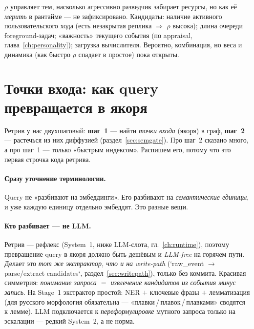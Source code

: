 \begin{openq}
$\rho$ управляет тем, насколько агрессивно разведчик забирает ресурсы, но как её
\emph{мерить} в рантайме — не зафиксировано. Кандидаты: наличие активного
пользовательского хода (есть незакрытая реплика $\Rightarrow$ $\rho$ высока); длина
очереди foreground-задач; «важность» текущего события (по appraisal,
глава~\ref{ch:personality}); загрузка вычислителя. Вероятно, комбинация, но веса и
динамика (как быстро $\rho$ спадает в простое) пока открыты.
\end{openq}

\section{Точки входа: как query превращается в якоря}
\label{sec:entrypoints}

Ретрив у нас двухшаговый: \textbf{шаг~1} — найти \emph{точки входа} (якоря) в граф,
\textbf{шаг~2} — растечься из них диффузией (раздел~\ref{sec:semgate}). Про шаг~2 сказано
много, а про шаг~1 — только «быстрым индексом». Распишем его, потому что это первая строчка
кода ретрива.

\paragraph{Сразу уточнение терминологии.} Query не «разбивают на эмбеддинги». Его разбивают
на \emph{семантические единицы}, и уже каждую единицу отдельно эмбеддят. Это разные вещи.

\paragraph{Кто разбивает — не LLM.} Ретрив — рефлекс (System~1, ниже LLM-слота,
гл.~\ref{ch:runtime}), поэтому превращение query в якоря должно быть дешёвым и
\emph{LLM-free} на горячем пути. Делает это \emph{тот же экстрактор, что и на write-path}
(`raw\_event $\to$ parse/extract candidates`, раздел~\ref{sec:writepath}), только без
коммита. Красивая симметрия: \emph{понимание запроса $=$ извлечение кандидатов из события
минус запись}. На Stage~1 экстрактор простой: NER $+$ ключевые фразы $+$ лемматизация
(для русского морфология обязательна — «плавки\,/\,плавок\,/\,плавками» сводятся к лемме).
LLM подключается к \emph{переформулировке} мутного запроса только на эскалации — редкий
System~2, а не норма.

